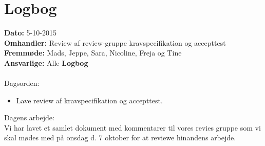 \section{Logbog}

\textbf{Dato:} 5-10-2015 \\
\textbf{Omhandler:} Review af review-gruppe kravspecifikation og accepttest \\
\textbf{Fremmøde:} Mads, Jeppe, Sara, Nicoline, Freja og Tine \\
\textbf{Ansvarlige:} Alle
\textbf{Logbog}
\\
\\
Dagsorden:
\begin{itemize}
	\item Lave review af kravspecifikation og accepttest. 
\end{itemize}

Dagens arbejde: \\
Vi har lavet et samlet dokument med kommentarer til vores revies gruppe som vi skal mødes med på onsdag d. 7 oktober for at reviewe hinandens arbejde. \\



